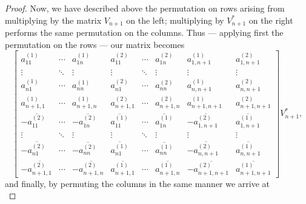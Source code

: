 \documentclass[10pt,a4paper]{amsart}
\begin{document}
\begin{proof}
    Now, we have described above the permutation on rows arising from multiplying by the matrix \(V_{n+1}\) on the left; multiplying by \(V_{n+1}^*\) on the right performs the same permutation on the columns. Thus --- applying first the permutation on the rows --- our matrix becomes
    \[
        \begin{bmatrix} a_{11}^{(1)} & \cdots & a_{1n}^{(1)} & a_{11}^{(2)} & \cdots & a_{1n}^{(2)} & a_{1,n+1}^{(1)} & a_{1,n+1}^{(2)} \\[6pt] \vdots & \ddots & \vdots & \vdots & \ddots & \vdots & \vdots & \vdots \\[6pt] a_{n1}^{(1)} & \cdots & a_{nn}^{(1)} & a_{n1}^{(2)} & \cdots & a_{nn}^{(2)}  & a_{n,n+1}^{(1)} & a_{n,n+1}^{(2)} \\[6pt] a_{n+1,1}^{(1)} & \cdots & a_{n+1,n}^{(1)} & a_{n+1,1}^{(2)} & \cdots & a_{n+1,n}^{(2)}& a_{n+1,n+1}^{(1)} & a_{n+1,n+1}^{(2)} \\[6pt] -\overline{a_{11}^{(2)}} & \cdots & -\overline{a_{1n}^{(2)}} & \overline{a_{11}^{(1)}} & \cdots & \overline{a_{1n}^{(1)}} & -\overline{a_{1,n+1}^{(2)}} & \overline{a_{1,n+1}^{(1)}} \\[6pt] \vdots & \ddots & \vdots & \vdots & \ddots & \vdots & \vdots & \vdots \\[6pt] -\overline{a_{n1}^{(2)}} & \cdots & -\overline{a_{nn}^{(2)}} & \overline{a_{n1}^{(1)}} & \cdots & \overline{a_{nn}^{(1)}} & -\overline{a_{n,n+1}^{(2)}} & \overline{a_{n,n+1}^{(1)}} \\[6pt] -\overline{a_{n+1,1}^{(2)}} & \cdots & -\overline{a_{n+1,n}^{(2)}} & \overline{a_{n+1,1}^{(1)}} & \cdots & \overline{a_{n+1,n}^{(1)}} & -\overline{a_{n+1,n+1}^{(2)}} & \overline{a_{n+1,n+1}^{(1)}} \end{bmatrix} V_{n+1}^*,
    \]
    and finally, by permuting the columns in the same manner we arrive at
    \[
\]
\end{proof}
\end{document}
